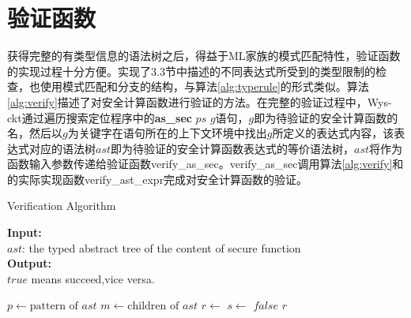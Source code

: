 \section{验证函数}
获得完整的有类型信息的语法树之后，得益于ML家族的模式匹配特性，验证函数的实现过程十分方便。实现了3.3节中描述的不同表达式所受到的类型限制的检查，也使用模式匹配和分支的结构，与算法\ref{alg:typerule}的形式类似。算法\ref{alg:verify}描述了对安全计算函数进行验证的方法。在完整的验证过程中，Wys-ckt通过遍历搜索定位程序中的\textbf{as\_sec} $ps$ $g$语句，$g$即为待验证的安全计算函数的名，然后以$g$为关键字在语句所在的上下文环境中找出$g$所定义的表达式内容，该表达式对应的语法树$ast$即为待验证的安全计算函数表达式的等价语法树，$ast$将作为函数输入参数传递给验证函数verify\_as\_sec。verify\_as\_sec调用算法\ref{alg:verify}和的实际实现函数verify\_ast\_expr完成对安全计算函数的验证。
\begin{algorithm}[!htbp]
    \small
    \caption{Verification Algorithm}\label{alg:verify}
    \hspace*{0.02in} {\bf Input:} \\
	\hspace*{0.04in} $ast$: the typed abstract tree of the content of secure function \\
	\hspace*{0.02in} {\bf Output:} \\
	\hspace*{0.04in} $true$ means succeed,vice versa.
    \begin{algorithmic}[1]
        \State $p\gets \text{pattern of } ast$ 
        \State $m\gets \text{children of } ast$ 
        \State $r\gets$  
        \State $s\gets$  
        \State \Return $false$
        \EndIf
        \EndFor
        \State \Return $r$
        \EndProcedure
    \end{algorithmic}
\end{algorithm}